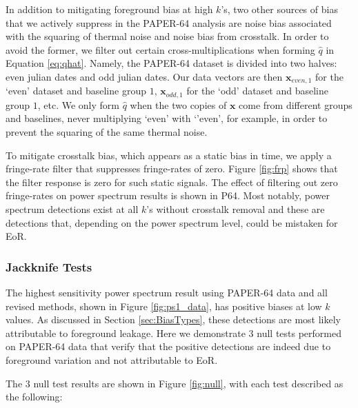 \documentclass[preprint2,numberedappendix,tighten]{aastex6}  %
\begin{document}
In addition to mitigating foreground bias at high $k$'s, two other sources of bias that we actively suppress in the PAPER-64 analysis are noise bias associated with the squaring of thermal noise and noise bias from crosstalk. In order to avoid the former, we filter out certain cross-multiplications when forming $\hat{q}$ in Equation \eqref{eq:qhat}. Namely, the PAPER-64 dataset is divided into two halves: even julian dates and odd julian dates. Our data vectors are then $\textbf{x}_{even, 1}$ for the `even' dataset and baseline group $1$, $\textbf{x}_{odd, 1}$ for the `odd' dataset and baseline group $1$, etc. We only form $\hat{q}$ when the two copies of $\textbf{x}$ come from different groups and baselines, never multiplying `even' with `'even', for example, in order to prevent the squaring of the same thermal noise.

To mitigate crosstalk bias, which appears as a static bias in time, we apply a fringe-rate filter that suppresses fringe-rates of zero. Figure \ref{fig:frp} shows that the filter response is zero for such static signals. The effect of filtering out zero fringe-rates on power spectrum results is shown in P64. Most notably, power spectrum detections exist at all $k$'s without crosstalk removal and these are detections that, depending on the power spectrum level, could be mistaken for EoR. 

\subsubsection{Jackknife Tests}

The highest sensitivity power spectrum result using PAPER-64 data and all revised methods, shown in Figure \ref{fig:ps1_data}, has positive biases at low $k$ values. As discussed in Section \ref{sec:BiasTypes}, these detections are most likely attributable to foreground leakage. Here we demonstrate $3$ null tests performed on PAPER-64 data that verify that the positive detections are indeed due to foreground variation and not attributable to EoR.

The $3$ null test results are shown in Figure \ref{fig:null}, with each test described as the following:
\end{document}
